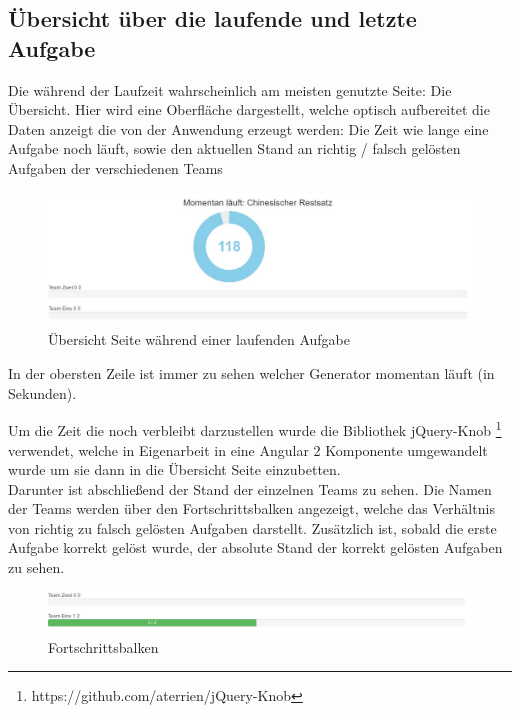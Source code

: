 \subsection{Übersicht über die laufende und letzte Aufgabe}

Die während der Laufzeit wahrscheinlich am meisten genutzte Seite: Die Übersicht. Hier wird eine Oberfläche dargestellt, welche optisch aufbereitet die Daten anzeigt die von der Anwendung erzeugt werden: Die Zeit wie lange eine Aufgabe noch läuft, sowie den aktuellen Stand an richtig / falsch gelösten Aufgaben der verschiedenen Teams \\
\begin{figure}[htp]     %
\centering
\includegraphics[width=1\textwidth]{bilder/Overview} 
\caption[Übersicht Seite während einer laufenden Aufgabe]{Übersicht Seite während einer laufenden Aufgabe}
\end{figure} 
In der obersten Zeile ist immer zu sehen welcher Generator momentan läuft (in Sekunden).

Um die Zeit die noch verbleibt darzustellen wurde die Bibliothek jQuery-Knob \footnote{https://github.com/aterrien/jQuery-Knob} verwendet, welche in Eigenarbeit in eine Angular 2 Komponente umgewandelt wurde um sie dann in die Übersicht Seite einzubetten. \\

Darunter ist abschließend der Stand der einzelnen Teams zu sehen. Die Namen der Teams werden über den Fortschrittsbalken angezeigt, welche das Verhältnis von richtig zu falsch gelösten Aufgaben darstellt. Zusätzlich ist, sobald die erste Aufgabe korrekt gelöst wurde, der absolute Stand der korrekt gelösten Aufgaben zu sehen. \\

\begin{figure}[htp]     %
\centering
\includegraphics[width=1\textwidth]{bilder/Bars} 
\caption[Fortschrittsbalken]{Fortschrittsbalken}
\end{figure} 

